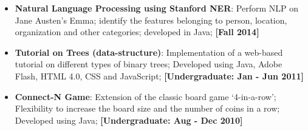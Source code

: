 \documentclass{article}
\begin{document}
\begin{multicols}{2}
\begin{itemize}[nolistsep,leftmargin=*]
				\item \textbf{Natural Language Processing using Stanford NER}: Perform NLP on Jane Austen's Emma; identify the features belonging to person, location, organization and other categories; developed in Java; \textbf{ [Fall 2014]}
				\item \textbf{Tutorial on Trees (data-structure)}: Implementation of a web-based tutorial on different types of binary trees; Developed using Java, Adobe Flash, HTML 4.0, CSS and JavaScript; \textbf{ [Undergraduate: Jan - Jun 2011]}
				\item \textbf{Connect-N Game}: Extension of the classic board game `4-in-a-row'; Flexibility to increase the board size and the number of coins in a row; Developed using Java; \textbf{[Undergraduate: Aug - Dec 2010]}
			\end{itemize}
		
	\end{multicols}
\end{document}
